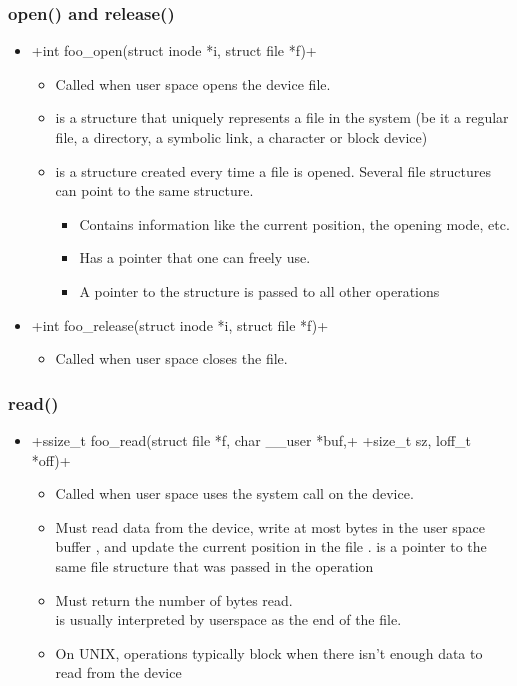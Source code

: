 \begin{frame}[fragile]
  \frametitle{open() and release()}
  \begin{itemize}
  \item {}+int foo_open(struct inode *i, struct file *f)+
    \begin{itemize}
    \item Called when user space opens the device file.
    \item {} is a structure that uniquely represents a file
      in the system (be it a regular file, a directory, a symbolic
      link, a character or block device)
    \item {} is a structure created every time a file is
      opened. Several file structures can point to the same
       structure.
      \begin{itemize}
      \item Contains information like the current position, the
        opening mode, etc.
      \item Has a  pointer that one can
        freely use.
      \item A pointer to the  structure is passed to all other
        operations
      \end{itemize}
    \end{itemize}
  \item {}+int foo_release(struct inode *i, struct file *f)+
    \begin{itemize}
    \item Called when user space closes the file.
    \end{itemize}
  \end{itemize}
\end{frame}

\begin{frame}
  \frametitle{read()}
  \begin{itemize}
  \item {}+ssize_t foo_read(struct file *f, char __user *buf,+
    +size_t sz, loff_t *off)+
    \begin{itemize}
    \item Called when user space uses the  system call on
      the device.
    \item Must read data from the device, write at most 
      bytes in the user space buffer , and update the
      current position in the file .  is a pointer
      to the same file structure that was passed in the 
      operation
    \item Must return the number of bytes read.\\
	   is usually interpreted by userspace as the end of
          the file.
    \item On UNIX,  operations typically block when there
      isn't enough data to read from the device
    \end{itemize}
  \end{itemize}
\end{frame}


